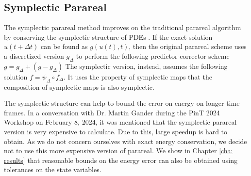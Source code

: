 \subsection{Symplectic Parareal}
\label{subsec: intro symplectic parareal}
The symplectic parareal method improves on the traditional parareal algorithm by conserving the symplectic structure of PDEs \cite{bal_symplectic_2008}. If the exact solution $u(t + \Delta t)$ can be found as $g(u(t),t)$, then the original parareal scheme uses a discretized version $g_{\Delta}$ to perform the following predictor-corrector scheme $g = g_\Delta + (g - g_\Delta)$ The symplectic version, instead, assumes the following solution $f = \psi_\Delta \circ f_\Delta$. It uses the property of symplectic maps that the composition of symplectic maps is also symplectic. 

The symplectic structure can help to bound the error on energy on longer time frames. In a conversation with Dr. Martin Gander during the PinT 2024 Workshop on February 8, 2024, it was mentioned that the symplectic parareal version is very expensive to calculate. Due to this, large speedup is hard to obtain. As we do not concern ourselves with exact energy conservation, we decide not to use this more expensive version of parareal. We show in Chapter \ref{cha: results} that reasonable bounds on the energy error can also be obtained using tolerances on the state variables.


